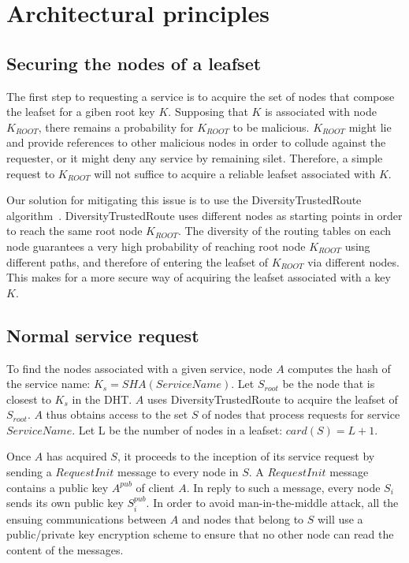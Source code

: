 
\section{Architectural principles}

\subsection{Securing the nodes of a leafset}

The first step to requesting a service is to acquire the set of nodes that
compose the leafset for a giben root key $K$. Supposing that $K$ is associated
with node $K_{ROOT}$, there remains a probability for $K_{ROOT}$ to be
malicious. $K_{ROOT}$ might lie and provide references to other malicious nodes
in order to collude against the requester, or it might deny any service by
remaining silet. Therefore, a simple request to $K_{ROOT}$ will not suffice to
acquire a reliable leafset associated with $K$.

Our solution for mitigating this issue is to use the DiversityTrustedRoute
algorithm~\cite{diversity_trusted_route}. DiversityTrustedRoute uses different
nodes as starting points in order to reach the same root node $K_{ROOT}$. The
diversity of the routing tables on each node guarantees a very high probability
of reaching root node $K_{ROOT}$ using different paths, and therefore of
entering the leafset of $K_{ROOT}$ via different nodes. This makes for a more
secure way of acquiring the leafset associated with a key $K$.

\subsection{Normal service request}

To find the nodes associated with a given service, node $A$ computes the hash
of the service name: $K_s = SHA(ServiceName)$. Let $S_{root} $ be the node that
is closest to $K_s$ in the DHT. $A$ uses DiversityTrustedRoute to acquire the
leafset of $S_{root}$. $A$ thus obtains access to the set $S$ of nodes that
process requests for service $ServiceName$. Let L be the number of nodes in a
leafset: $card(S) = L + 1$.

Once $A$ has acquired $S$, it proceeds to the inception of its service request
by sending a $RequestInit$ message to every node in $S$. A $RequestInit$
message contains a public key $A^{pub}$ of client $A$. In reply to such a
message, every node $S_i$ sends its own public key $S^{pub}_i$. In order to
avoid man-in-the-middle attack, all the ensuing communications between $A$ and
nodes that belong to $S$ will use a public/private key encryption scheme to
ensure that no other node can read the content of the messages.

